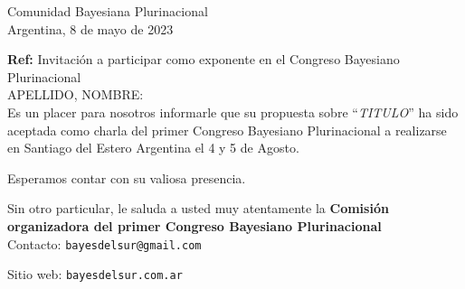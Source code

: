 \documentclass[a4paper,11pt]{article}
\begin{document}
\begin{flushright}
Comunidad Bayesiana Plurinacional \\
Argentina, 8 de mayo de 2023
\end{flushright} 

\vspace{0.1cm}
\noindent

\hfill \textbf{Ref:} Invitación a participar como exponente en el Congreso Bayesiano Plurinacional \\

\noindent APELLIDO, NOMBRE:\\

\indent Es un placer para nosotros informarle que su propuesta sobre ``\emph{TITULO}'' ha sido aceptada como charla del primer Congreso Bayesiano Plurinacional a realizarse en Santiago del Estero Argentina el 4 y 5 de Agosto.

\vspace{0.3cm}

\indent Esperamos contar con su valiosa presencia.

\vspace{0.3cm}

\indent Sin otro particular, le saluda a usted muy atentamente la \textbf{Comisión organizadora del primer Congreso Bayesiano Plurinacional}\\

 \vspace{0.8cm}
\small
 Contacto: \texttt{bayesdelsur@gmail.com}

 Sitio web: \texttt{bayesdelsur.com.ar}
\end{document}

